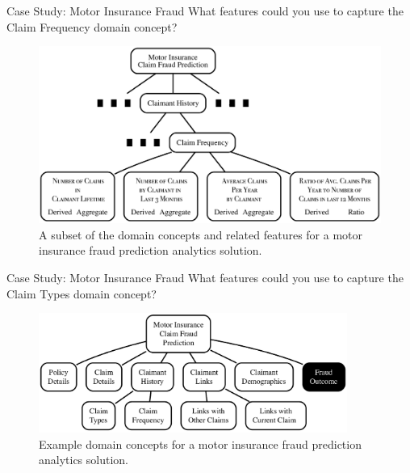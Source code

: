 \documentclass[xcolor={table}]{beamer}
\begin{document}
 \begin{frame} [plain]
  \begin{block}{Case Study: Motor Insurance Fraud}
  What features could you use to capture the Claim Frequency domain concept?
\begin{figure}[htb]
	\begin{center}
			\includegraphics[width=\textwidth]{./images/motorInsurance2_SMCAPS.pdf}
	\end{center}
	\caption{A subset of the domain concepts and related features for a motor insurance fraud prediction analytics solution.}
	\label{fig:metricExample1}
\end{figure}
 \end{block}
\end{frame} 

 \begin{frame} [plain]
 \begin{block}{Case Study: Motor Insurance Fraud}
What features could you use to capture the Claim Types domain concept?
\begin{figure}[htb]
	\begin{center}
			\includegraphics[width=0.9\textwidth]{./images/motorInsurance1.pdf}
	\end{center}
	\caption{Example domain concepts for a motor insurance fraud prediction analytics solution.}
	\label{fig:DataMetrics3}
\end{figure}
\end{block}
\end{frame} 
\end{document}

